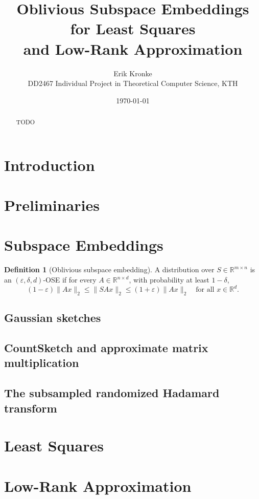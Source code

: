 \documentclass[11pt,a4paper]{article}
\title{Oblivious Subspace Embeddings for Least Squares\\and Low-Rank Approximation}
\author{Erik Kronke\\\small DD2467 Individual Project in Theoretical Computer Science, KTH}
\date{\today}
\theoremstyle{definition}
\newtheorem{definition}[theorem]{Definition}
\newcommand{\R}{\mathbb{R}}
\begin{document}
\maketitle

\begin{abstract}
TODO
\end{abstract}

\section{Introduction}\label{sec:intro}

\section{Preliminaries}\label{sec:prelim}

\section{Subspace Embeddings}\label{sec:embeddings}
\begin{definition}[Oblivious subspace embedding]
A distribution over $S \in \R^{m \times n}$ is an $(\varepsilon,\delta,d)$-OSE if for every
$A \in \R^{n \times d}$, with probability at least $1-\delta$,
\[
(1-\varepsilon)\|Ax\|_2 \le \|SAx\|_2 \le (1+\varepsilon)\|Ax\|_2 \quad \text{for all } x \in \R^d .
\]
\end{definition}
\subsection{Gaussian sketches}
\subsection{CountSketch and approximate matrix multiplication}
\subsection{The subsampled randomized Hadamard transform}

\section{Least Squares}\label{sec:ls}

\section{Low-Rank Approximation}\label{sec:lra}
\end{document}
